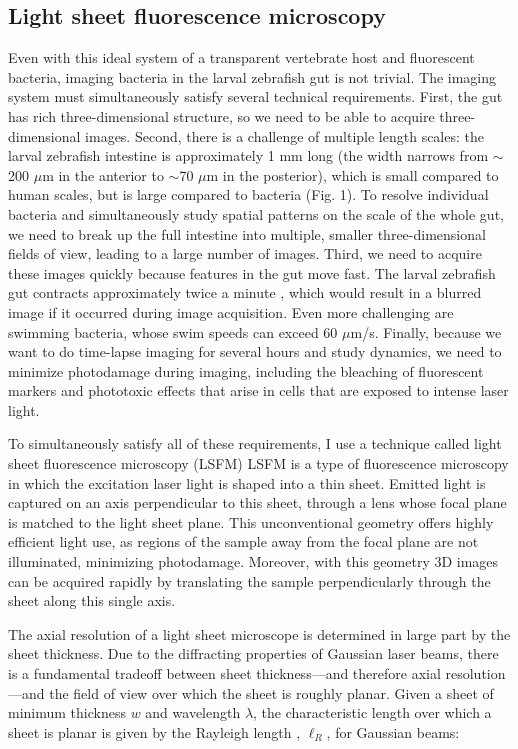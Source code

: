 \subsection{Light sheet fluorescence microscopy}
Even with this ideal system of a transparent vertebrate host and fluorescent bacteria, imaging bacteria in the larval zebrafish gut is not trivial. The imaging system must simultaneously satisfy several technical requirements. First, the gut has rich three-dimensional structure, so we need to be able to acquire three-dimensional images. Second, there is a challenge of multiple length scales: the larval zebrafish intestine is approximately 1 mm long (the width narrows from $\sim$200 $\mu$m in the anterior to $\sim$70 $\mu$m in the posterior), which is small compared to human scales, but is large compared to bacteria (Fig. 1). To resolve individual bacteria and simultaneously study spatial patterns on the scale of the whole gut, we need to break up the full intestine into multiple, smaller three-dimensional fields of view, leading to a large number of images. Third, we need to acquire these images quickly because features in the gut move fast. The larval zebrafish gut contracts approximately twice a minute \cite{ganz_image_2018}, which would result in a blurred image if it occurred during image acquisition. Even more challenging are swimming bacteria, whose swim speeds can exceed 60 $\mu$m/s. Finally, because we want to do time-lapse imaging for several hours and study dynamics, we need to minimize photodamage during imaging, including the bleaching of fluorescent markers and phototoxic effects that arise in cells that are exposed to intense laser light. 

To simultaneously satisfy all of these requirements, I use a technique called light sheet fluorescence microscopy (LSFM) \cite{keller2008reconstruction,parthasarathy_monitoring_2018} LSFM is a type of fluorescence microscopy in which the excitation laser light is shaped into a thin sheet. Emitted light is captured on an axis perpendicular to this sheet, through a lens whose focal plane is matched to the light sheet plane. This unconventional geometry offers highly efficient light use, as regions of the sample away from the focal plane are not illuminated, minimizing photodamage. Moreover, with this geometry 3D images can be acquired rapidly by translating the sample perpendicularly through the sheet along this single axis. 

The axial resolution of a light sheet microscope is determined in large part by the sheet thickness. Due to the diffracting properties of Gaussian laser beams, there is a fundamental tradeoff between sheet thickness---and therefore axial resolution---and the field of view over which the sheet is roughly planar. Given a sheet of minimum thickness $w$ and wavelength $\lambda$, the characteristic length over which a sheet is planar is given by the Rayleigh length \cite{pedrotti2017introduction}, $\ell_R$,  for Gaussian beams:

